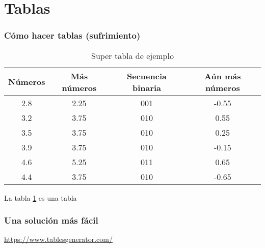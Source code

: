 \section{Tablas}

\begin{frame}
    \frametitle{Cómo hacer tablas (sufrimiento)}
    
    \centering
    \begin{table}[]
        \begin{tabular}{|c|c|c|c|}
        \hline
        Números & Más números & Secuencia binaria & Aún más números        \\ \hline
        2.8     & 2.25        & 001               & -0.55                  \\ \hline
        3.2     & 3.75        & 010               & 0.55                   \\ \hline
        3.5     & 3.75        & 010               & 0.25                   \\ \hline
        3.9     & 3.75        & 010               & -0.15                  \\ \hline
        4.6     & 5.25        & 011               & 0.65                   \\ \hline
        4.4     & 3.75        & 010               & -0.65                  \\ \hline
        \end{tabular}
    \caption{Super tabla de ejemplo}
    \label{tablitatabla}
    \end{table}
    La tabla \ref{tablitatabla} es una tabla
    \end{frame}
\begin{frame}
\frametitle{Una solución más fácil}

\centering
\url{https://www.tablesgenerator.com/}
    
\end{frame}